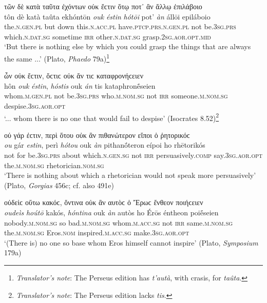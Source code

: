 \begin{exe}
\ex τῶν δὲ κατὰ ταῦτα ἐχόντων οὐκ ἔϲτιν ὅτῳ ποτ᾽ ἂν ἄλλῳ ἐπιλάβοιο\\
\gll tôn dè katà taûta ekhóntōn \emph{ouk} \emph{éstin} \emph{hótōi} pot' \emph{àn} állōi epiláboio\\
the.\textsc{n.gen.pl} but down this.\textsc{n.acc.pl} have.\textsc{ptcp.prs.n.gen.pl} not be.\textsc{3sg.prs} which.\textsc{n.dat.sg} sometime \textsc{irr} other.\textsc{n.dat.sg} grasp.\textsc{2sg.aor.opt.mid}\\
\trans `But there is nothing else by which you could grasp the things that are always the same ...' (Plato, \textit{Phaedo} 79a)\footnote{\emph{Translator's note}: The Perseus edition has \textit{t'autà}, with crasis, for \textit{taûta}.}
\label{relan16}
\end{exe}

\begin{exe}
\ex ὧν οὐκ ἔϲτιν, ὅϲτιϲ οὐκ ἄν τιϲ καταφρονήϲειεν\\
\gll hôn \emph{ouk} \emph{éstin}, \emph{hóstis} ouk \emph{án} tis kataphronḗseien\\
whom.\textsc{m.gen.pl} not be.\textsc{3sg.prs} who.\textsc{m.nom.sg} not \textsc{irr} someone.\textsc{m.nom.sg} despise.\textsc{3sg.aor.opt}\\
\trans `... whom there is no one that would fail to despise' (Isocrates 8.52)\footnote{\emph{Translator's note}: The Perseus edition lacks \textit{tis}.}
\label{relan17}
\end{exe}

\begin{exe}
\ex οὐ γάρ ἐϲτιν, περὶ ὅτου οὐκ ἂν πιθανώτερον εἴποι ὁ ῥητορικόϲ\\
\gll \emph{ou} gár \emph{estin}, perì \emph{hótou} ouk \emph{àn} pithanṓteron eípoi ho rhētorikós\\
not for be.\textsc{3sg.prs} about which.\textsc{n.gen.sg} not \textsc{irr} persuasively.\textsc{comp} say.\textsc{3sg.aor.opt} the.\textsc{m.nom.sg}
rhetorician.\textsc{nom.sg}\\
\trans `There is nothing about which a rhetorician would not speak more persuasively' (Plato, \textit{Gorgias} 456c; cf. also 491e)
\label{relan18}
\end{exe}

\begin{exe}
\ex οὐδεὶϲ οὕτω κακόϲ, ὅντινα οὐκ ἂν αυτὸϲ ὁ Ἔρωϲ ἔνθεον ποιήϲειεν\\
\gll \emph{oudeìs} \emph{hoútō} kakós, \emph{hóntina} ouk \emph{àn} autòs ho Érōs éntheon poiḗseien\\
nobody.\textsc{m.nom.sg} so bad.\textsc{m.nom.sg} whom.\textsc{m.acc.sg} not \textsc{irr} same.\textsc{m.nom.sg} the.\textsc{m.nom.sg} Eros.\textsc{nom}
inspired.\textsc{m.acc.sg} make.\textsc{3sg.aor.opt}\\
\trans `(There is) no one so base whom Eros himself cannot inspire' (Plato, \textit{Symposium} 179a)
\label{relan19}
\end{exe}

